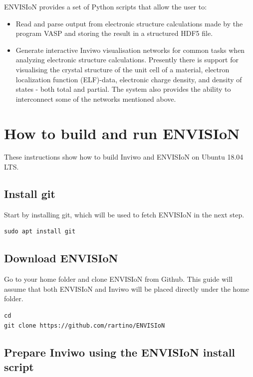 \documentclass[a4paper,12pt]{article}
\begin{document}
ENVISIoN provides a set of Python scripts that allow the user to:

\begin{itemize}
\item Read and parse output from electronic structure calculations made by the program VASP and storing the result in a structured HDF5 file.
\item Generate interactive Inviwo visualisation networks for common tasks when analyzing electronic structure calculations. Presently there is support for visualising the crystal structure of the unit cell of a material, electron localization function (ELF)-data, electronic charge density, and density of states - both total and partial.
The system also provides the ability to interconnect some of the networks mentioned above.
\end{itemize}

\section{How to build and run ENVISIoN}
These instructions show how to build Inviwo and ENVISIoN on Ubuntu
18.04 LTS.

\subsection{Install git}

Start by installing git, which will be used to fetch ENVISIoN in the
next step.

\begin{lstlisting}[frame = single, breaklines=true]
sudo apt install git
\end{lstlisting}

\subsection{Download ENVISIoN}

Go to your home folder and clone ENVISIoN from Github. This guide will
assume that both ENVISIoN and Inviwo will be placed directly under the
home folder.

\begin{lstlisting}[frame = single, breaklines=true]
cd
git clone https://github.com/rartino/ENVISIoN
\end{lstlisting}

\subsection{Prepare Inviwo using the ENVISIoN install script}
\end{document}

